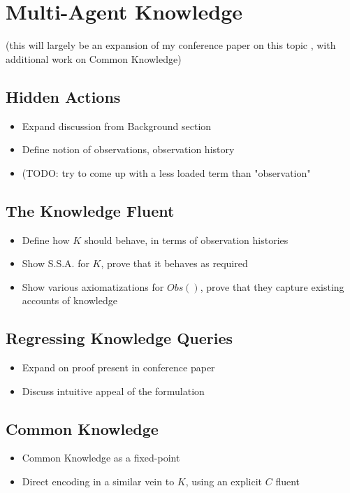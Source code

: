 \chapter{Multi-Agent Knowledge}\label{ch:knowledge}
\minitoc
\onehalfspace   %

(this will largely be an expansion of my conference paper on this topic \cite{kelly07sc_know_obs}, with additional work on Common Knowledge)

\section{Hidden Actions}

\begin{itemize}
\item Expand discussion from Background section
\item Define notion of observations, observation history
\item (TODO: try to come up with a less loaded term than "observation"
\end{itemize}

\section{The Knowledge Fluent}

\begin{itemize}
\item Define how $K$ should behave, in terms of observation histories
\item Show S.S.A. for $K$, prove that it behaves as required
\item Show various axiomatizations for $Obs()$, prove that they capture
existing accounts of knowledge
\end{itemize}

\section{Regressing Knowledge Queries}

\begin{itemize}
\item Expand on proof present in conference paper
\item Discuss intuitive appeal of the formulation
\end{itemize}

\section{Common Knowledge}

\begin{itemize}
\item Common Knowledge as a fixed-point
\item Direct encoding in a similar vein to $K$, using an explicit $C$ fluent
\end{itemize}


